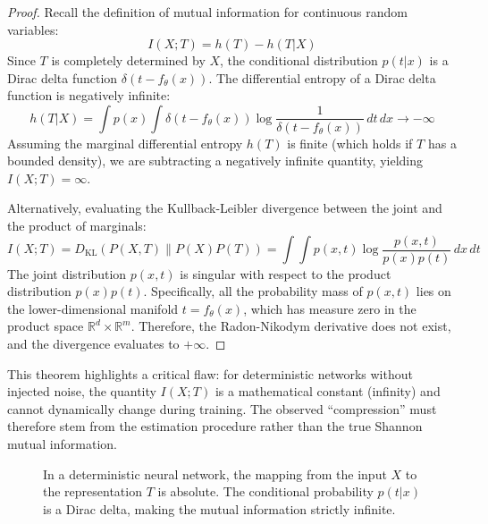 \begin{proof}
Recall the definition of mutual information for continuous random variables:
\[
I(X; T) = h(T) - h(T | X)
\]
Since $T$ is completely determined by $X$, the conditional distribution $p(t | x)$ is a Dirac delta function $\delta(t - f_\theta(x))$. The differential entropy of a Dirac delta function is negatively infinite:
\[
h(T | X) = \int p(x) \int \delta(t - f_\theta(x)) \log \frac{1}{\delta(t - f_\theta(x))} \, dt \, dx \to -\infty
\]
Assuming the marginal differential entropy $h(T)$ is finite (which holds if $T$ has a bounded density), we are subtracting a negatively infinite quantity, yielding $I(X; T) = \infty$.

Alternatively, evaluating the Kullback-Leibler divergence between the joint and the product of marginals:
\[
I(X; T) = D_{\text{KL}}(P(X, T) \parallel P(X)P(T)) = \int \int p(x, t) \log \frac{p(x, t)}{p(x)p(t)} \, dx \, dt
\]
The joint distribution $p(x, t)$ is singular with respect to the product distribution $p(x)p(t)$. Specifically, all the probability mass of $p(x,t)$ lies on the lower-dimensional manifold $t = f_\theta(x)$, which has measure zero in the product space $\mathbb{R}^d \times \mathbb{R}^m$. Therefore, the Radon-Nikodym derivative does not exist, and the divergence evaluates to $+\infty$.
\end{proof}

This theorem highlights a critical flaw: for deterministic networks without injected noise, the quantity $I(X; T)$ is a mathematical constant (infinity) and cannot dynamically change during training. The observed ``compression'' must therefore stem from the estimation procedure rather than the true Shannon mutual information.

\begin{figure}[htbp]
\centering
{}
\caption{In a deterministic neural network, the mapping from the input $X$ to the representation $T$ is absolute. The conditional probability $p(t|x)$ is a Dirac delta, making the mutual information strictly infinite.}
\label{fig:deterministic_mapping}
\end{figure}

